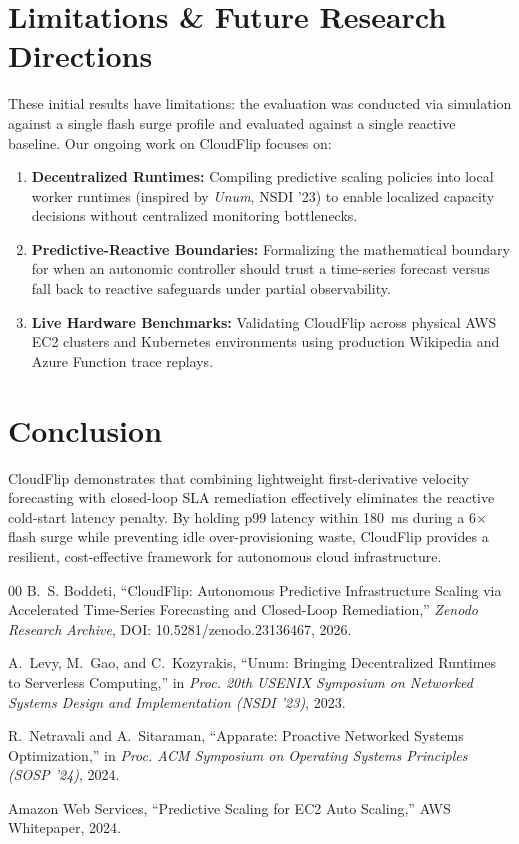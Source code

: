 \documentclass[10pt,journal,compsoc]{IEEEtran}
\begin{document}
\section{Limitations \& Future Research Directions}
These initial results have limitations: the evaluation was conducted via simulation against a single flash surge profile and evaluated against a single reactive baseline. Our ongoing work on CloudFlip focuses on:
\begin{enumerate}
    \item \textbf{Decentralized Runtimes:} Compiling predictive scaling policies into local worker runtimes (inspired by \textit{Unum}, NSDI '23) to enable localized capacity decisions without centralized monitoring bottlenecks.
    \item \textbf{Predictive-Reactive Boundaries:} Formalizing the mathematical boundary for when an autonomic controller should trust a time-series forecast versus fall back to reactive safeguards under partial observability.
    \item \textbf{Live Hardware Benchmarks:} Validating CloudFlip across physical AWS EC2 clusters and Kubernetes environments using production Wikipedia and Azure Function trace replays.
\end{enumerate}

\section{Conclusion}
CloudFlip demonstrates that combining lightweight first-derivative velocity forecasting with closed-loop SLA remediation effectively eliminates the reactive cold-start latency penalty. By holding p99 latency within 180~ms during a 6$\times$ flash surge while preventing idle over-provisioning waste, CloudFlip provides a resilient, cost-effective framework for autonomous cloud infrastructure.

\begin{thebibliography}{00}
B.~S. Boddeti, ``CloudFlip: Autonomous Predictive Infrastructure Scaling via Accelerated Time-Series Forecasting and Closed-Loop Remediation,'' \emph{Zenodo Research Archive}, DOI: 10.5281/zenodo.23136467, 2026.

A.~Levy, M.~Gao, and C.~Kozyrakis, ``Unum: Bringing Decentralized Runtimes to Serverless Computing,'' in \emph{Proc. 20th USENIX Symposium on Networked Systems Design and Implementation (NSDI '23)}, 2023.

R.~Netravali and A.~Sitaraman, ``Apparate: Proactive Networked Systems Optimization,'' in \emph{Proc. ACM Symposium on Operating Systems Principles (SOSP '24)}, 2024.

Amazon Web Services, ``Predictive Scaling for EC2 Auto Scaling,'' AWS Whitepaper, 2024.
\end{thebibliography}
\end{document}
